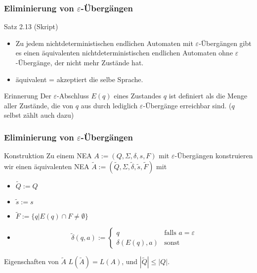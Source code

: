 \documentclass{beamer}
\begin{document}
\begin{frame}
	\frametitle{Eliminierung von $\varepsilon$-Übergängen}
	\begin{block}{Satz 2.13 (Skript)}
	\begin{itemize}
	 \item Zu jedem nichtdeterministischen endlichen Automaten mit \(\varepsilon\)-Übergängen gibt es einen äquivalenten nichtdeterministischen
	 endlichen Automaten ohne \(\varepsilon\)-Übergänge, der nicht mehr Zustände hat.
	 \item äquivalent = akzeptiert die selbe Sprache.
	\end{itemize}
	\end{block}
	\begin{block}{Erinnerung}
		Der \(\varepsilon\)-Abschluss $E(q)$ eines Zustandes $q$ ist definiert als die Menge aller Zustände, die von $q$ aus durch lediglich \(\varepsilon\)-Übergänge erreichbar sind. ($q$ selbst zählt auch dazu)
	\end{block}
\end{frame}
\begin{frame}
\frametitle{Eliminierung von $\varepsilon$-Übergängen}
	\begin{block}{Konstruktion}
	Zu einem NEA \(A := (Q, \Sigma, \delta, s, F)\) mit \(\varepsilon\)-Übergängen konstruieren wir einen 
	  äquivalenten NEA \(\tilde{A} := (\tilde{Q}, \Sigma, \tilde{\delta}, \tilde{s}, \tilde{F})\) mit
	 \begin{itemize}
	 \item \(\tilde{Q} := Q\)
	 \item \(\tilde{s} := s\)
	 \item \(\tilde{F} := \{q|E(q)\cap F \neq \emptyset\}\)
	 \item \[\tilde{\delta}(q,a) := 
	 \begin{cases}
	  {q}			& \text{falls $a = \varepsilon$} \\
	 \delta(E(q),a)	& \text{sonst}
	 \end{cases}\]
	 \end{itemize}
	\end{block}
	\begin{block}{Eigenschaften von \(\tilde{A}\)}
	 \(L(\tilde{A}) = L(A)\), und \(|\tilde{Q}| \leq |Q|\).
	\end{block}

\end{frame}
\end{document}

